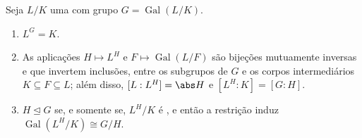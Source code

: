 \begin{theorem}
\label{thm:b3:galois:fundamental}
Seja $L/K$ uma  com grupo
$G =
\operatorname{Gal}(L/K)$.
\begin{enumerate}
  \item $L^G = K$.
  \item As aplicações $H \mapsto L^H$ e $F \mapsto
        \operatorname{Gal}(L/F)$ são bijeções mutuamente inversas e
        que invertem inclusões, entre os subgrupos de $G$ e os
        corpos intermediários $K \subseteq F \subseteq L$; além disso, $[L : L^H] = \abs H$ e $[L^H : K] = [G : H]$.
  \item $H \trianglelefteq G$ se, e somente se, $L^H/K$ é , e então a
        restrição induz $\operatorname{Gal}(L^H/K) \cong
        G/H$.
\end{enumerate}
\end{theorem}

